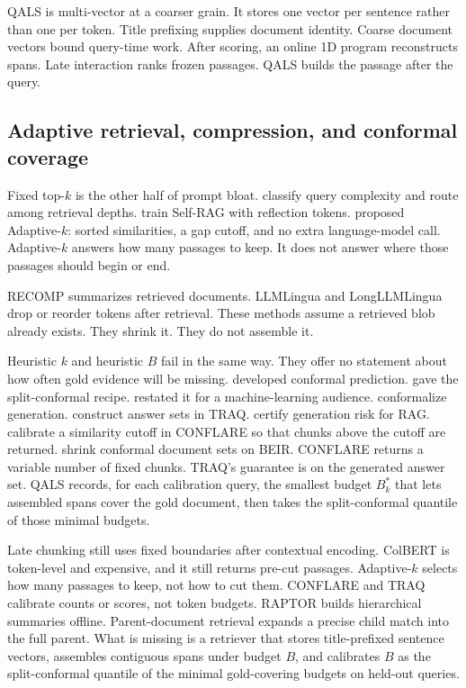 \documentclass[preprint,12pt,authoryear]{elsarticle}
\begin{document}
QALS is multi-vector at a coarser grain. It stores one vector per sentence rather than one per token. Title prefixing supplies document identity. Coarse document vectors bound query-time work. After scoring, an online 1D program reconstructs spans. Late interaction ranks frozen passages. QALS builds the passage after the query.

\subsection{Adaptive retrieval, compression, and conformal coverage}
Fixed top-\(k\) is the other half of prompt bloat. \citet{jeong2024adaptive} classify query complexity and route among retrieval depths. \citet{asai2024self} train Self-RAG with reflection tokens. \citet{taguchi2025adaptivek} proposed Adaptive-\(k\): sorted similarities, a gap cutoff, and no extra language-model call. Adaptive-\(k\) answers how many passages to keep. It does not answer where those passages should begin or end.

RECOMP \citep{xu2024recomp} summarizes retrieved documents. LLMLingua \citep{jiang2023llmlingua} and LongLLMLingua \citep{jiang2024longllmlingua} drop or reorder tokens after retrieval. These methods assume a retrieved blob already exists. They shrink it. They do not assemble it.

Heuristic \(k\) and heuristic \(B\) fail in the same way. They offer no statement about how often gold evidence will be missing. \citet{vovk2005algorithmic} developed conformal prediction. \citet{lei2018distribution} gave the split-conformal recipe. \citet{angelopoulos2023conformal} restated it for a machine-learning audience. \citet{quach2024conformal} conformalize generation. \citet{li2024traq} construct answer sets in TRAQ. \citet{kang2024crag} certify generation risk for RAG. \citet{rouzrokh2024conflare} calibrate a similarity cutoff in CONFLARE so that chunks above the cutoff are returned. \citet{intrator2024streamlining} shrink conformal document sets on BEIR. CONFLARE returns a variable number of fixed chunks. TRAQ's guarantee is on the generated answer set. QALS records, for each calibration query, the smallest budget \(B_k^*\) that lets assembled spans cover the gold document, then takes the split-conformal quantile of those minimal budgets.

Late chunking still uses fixed boundaries after contextual encoding. ColBERT is token-level and expensive, and it still returns pre-cut passages. Adaptive-\(k\) selects how many passages to keep, not how to cut them. CONFLARE and TRAQ calibrate counts or scores, not token budgets. RAPTOR builds hierarchical summaries offline. Parent-document retrieval expands a precise child match into the full parent. What is missing is a retriever that stores title-prefixed sentence vectors, assembles contiguous spans under budget \(B\), and calibrates \(B\) as the split-conformal quantile of the minimal gold-covering budgets on held-out queries.
\end{document}
